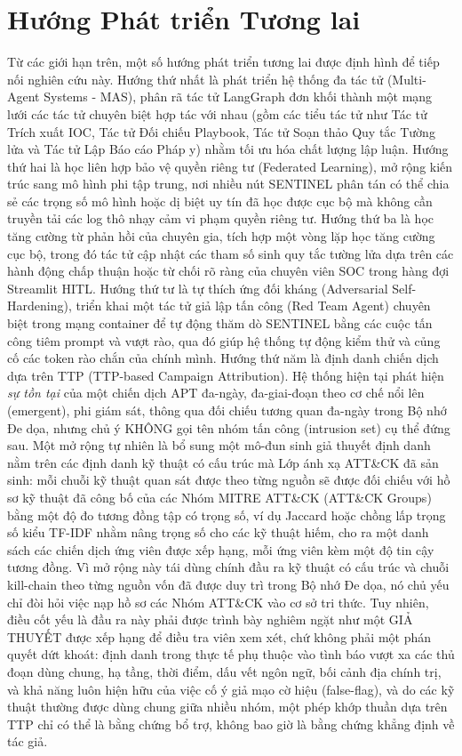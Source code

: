 \section{Hướng Phát triển Tương lai}
Từ các giới hạn trên, một số hướng phát triển tương lai được định hình để tiếp nối nghiên cứu này. Hướng thứ nhất là phát triển hệ thống đa tác tử (Multi-Agent Systems - MAS), phân rã tác tử LangGraph đơn khối thành một mạng lưới các tác tử chuyên biệt hợp tác với nhau (gồm các tiểu tác tử như Tác tử Trích xuất IOC, Tác tử Đối chiếu Playbook, Tác tử Soạn thảo Quy tắc Tường lửa và Tác tử Lập Báo cáo Pháp y) nhằm tối ưu hóa chất lượng lập luận. Hướng thứ hai là học liên hợp bảo vệ quyền riêng tư (Federated Learning), mở rộng kiến trúc sang mô hình phi tập trung, nơi nhiều nút SENTINEL phân tán có thể chia sẻ các trọng số mô hình hoặc dị biệt uy tín đã học được cục bộ mà không cần truyền tải các log thô nhạy cảm vi phạm quyền riêng tư. Hướng thứ ba là học tăng cường từ phản hồi của chuyên gia, tích hợp một vòng lặp học tăng cường cục bộ, trong đó tác tử cập nhật các tham số sinh quy tắc tường lửa dựa trên các hành động chấp thuận hoặc từ chối rõ ràng của chuyên viên SOC trong hàng đợi Streamlit HITL. Hướng thứ tư là tự thích ứng đối kháng (Adversarial Self-Hardening), triển khai một tác tử giả lập tấn công (Red Team Agent) chuyên biệt trong mạng container để tự động thăm dò SENTINEL bằng các cuộc tấn công tiêm prompt và vượt rào, qua đó giúp hệ thống tự động kiểm thử và củng cố các token rào chắn của chính mình. Hướng thứ năm là định danh chiến dịch dựa trên TTP (TTP-based Campaign Attribution). Hệ thống hiện tại phát hiện \emph{sự tồn tại} của một chiến dịch APT đa-ngày, đa-giai-đoạn theo cơ chế nổi lên (emergent), phi giám sát, thông qua đối chiếu tương quan đa-ngày trong Bộ nhớ Đe dọa, nhưng chủ ý KHÔNG gọi tên nhóm tấn công (intrusion set) cụ thể đứng sau. Một mở rộng tự nhiên là bổ sung một mô-đun sinh giả thuyết định danh nằm trên các định danh kỹ thuật có cấu trúc mà Lớp ánh xạ ATT\&CK đã sản sinh: mỗi chuỗi kỹ thuật quan sát được theo từng nguồn sẽ được đối chiếu với hồ sơ kỹ thuật đã công bố của các Nhóm MITRE ATT\&CK (ATT\&CK Groups) bằng một độ đo tương đồng tập có trọng số, ví dụ Jaccard hoặc chồng lấp trọng số kiểu TF-IDF nhằm nâng trọng số cho các kỹ thuật hiếm, cho ra một danh sách các chiến dịch ứng viên được xếp hạng, mỗi ứng viên kèm một độ tin cậy tương đồng. Vì mở rộng này tái dùng chính đầu ra kỹ thuật có cấu trúc và chuỗi kill-chain theo từng nguồn vốn đã được duy trì trong Bộ nhớ Đe dọa, nó chủ yếu chỉ đòi hỏi việc nạp hồ sơ các Nhóm ATT\&CK vào cơ sở tri thức. Tuy nhiên, điều cốt yếu là đầu ra này phải được trình bày nghiêm ngặt như một GIẢ THUYẾT được xếp hạng để điều tra viên xem xét, chứ không phải một phán quyết dứt khoát: định danh trong thực tế phụ thuộc vào tình báo vượt xa các thủ đoạn dùng chung, hạ tầng, thời điểm, dấu vết ngôn ngữ, bối cảnh địa chính trị, và khả năng luôn hiện hữu của việc cố ý giả mạo cờ hiệu (false-flag), và do các kỹ thuật thường được dùng chung giữa nhiều nhóm, một phép khớp thuần dựa trên TTP chỉ có thể là bằng chứng bổ trợ, không bao giờ là bằng chứng khẳng định về tác giả.

